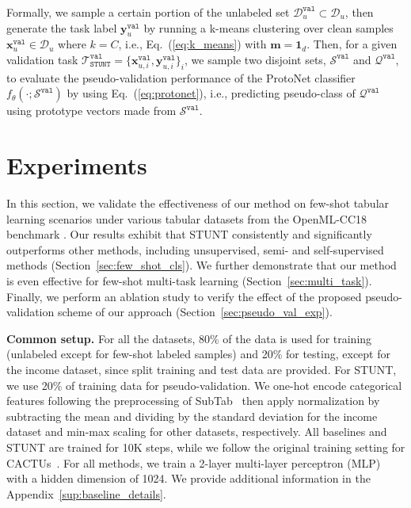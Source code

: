 Formally, we sample a certain portion of the unlabeled set $\mathcal{D}_{u}^{\mathtt{val}}\subset \mathcal{D}_u$, then generate the task label ${{\mathbf{y}}}_{u}^{\mathtt{val}}$ by running a k-means clustering over clean samples ${\mathbf{x}}_u^{\mathtt{val}}\in \mathcal{D}_{u}$ where $k=C$, i.e., Eq.~(\ref{eq:k_means}) with ${\mathbf{m}}=\mathbf{1}_d$. Then, for a given validation task $\mathcal{T}_{\mathtt{STUNT}}^{\mathtt{val}}=\{{\mathbf{x}}_{u,i}^{\mathtt{val}},{{\mathbf{y}}}_{u,i}^{\mathtt{val}}\}_{i}$, we sample two disjoint sets, $\mathcal{S}^{\mathtt{val}}$ and $\mathcal{Q}^{\mathtt{val}}$, to evaluate the pseudo-validation performance of the ProtoNet classifier $f_{\theta}(\cdot;\mathcal{S}^\mathtt{val})$ by using Eq.~(\ref{eq:protonet}), i.e., predicting pseudo-class of $\mathcal{Q}^{\mathtt{val}}$ using prototype vectors made from $\mathcal{S}^{\mathtt{val}}$.

\section{Experiments}
\label{sec:exp}

In this section, we validate the effectiveness of our method on few-shot tabular learning scenarios under various tabular datasets from the OpenML-CC18 benchmark \citep{bishcl2018openml}. Our results exhibit that STUNT consistently and significantly outperforms other methods, including unsupervised, semi- and self-supervised methods (Section~\ref{sec:few_shot_cls}). We further demonstrate that our method is even effective for few-shot multi-task learning (Section~\ref{sec:multi_task}). Finally, we perform an ablation study to verify the effect of the proposed pseudo-validation scheme of our approach (Section~\ref{sec:pseudo_val_exp}). 

\textbf{Common setup.} For all the datasets, 80\% of the data is used for training (unlabeled except for few-shot labeled samples) and 20\% for testing, except for the income dataset, since split training and test data are provided. For STUNT, we use 20\% of training data for pseudo-validation. We one-hot encode categorical features following the preprocessing of SubTab~\citep{ucar2021subtab} then apply normalization by subtracting the mean and dividing by the standard deviation for the income dataset and min-max scaling for other datasets, respectively. All baselines and STUNT are trained for 10K steps, while we follow the original training setting for CACTUs~\citep{hsu2018cactus}. For all methods, we train a 2-layer multi-layer perceptron (MLP) with a hidden dimension of 1024. We provide additional information in the Appendix~\ref{sup:baseline_details}.


